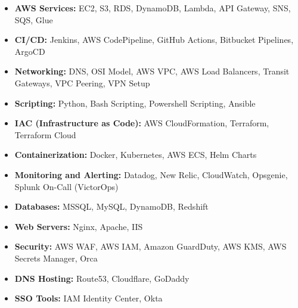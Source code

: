 \documentclass[10pt,a4paper,ragged2e,withhyper]{altacv}
\begin{document}


\begin{itemize}
    \item \textbf{AWS Services:} EC2, S3, RDS, DynamoDB, Lambda, API Gateway, SNS, SQS, Glue
    \item \textbf{CI/CD:} Jenkins, AWS CodePipeline, GitHub Actions, Bitbucket Pipelines, ArgoCD
    \item \textbf{Networking:} DNS, OSI Model, AWS VPC, AWS Load Balancers, Transit Gateways, VPC Peering, VPN Setup
    \item \textbf{Scripting:} Python, Bash Scripting, Powershell Scripting, Ansible
    \item \textbf{IAC (Infrastructure as Code):} AWS CloudFormation, Terraform, Terraform Cloud
    \item \textbf{Containerization:} Docker, Kubernetes, AWS ECS, Helm Charts
    \item \textbf{Monitoring and Alerting:} Datadog, New Relic, CloudWatch, Opsgenie, Splunk On-Call (VictorOps)
    \item \textbf{Databases:} MSSQL, MySQL, DynamoDB, Redshift
    \item \textbf{Web Servers:} Nginx, Apache, IIS
    \item \textbf{Security:} AWS WAF, AWS IAM, Amazon GuardDuty, AWS KMS, AWS Secrets Manager, Orca
    \item \textbf{DNS Hosting:} Route53, Cloudflare, GoDaddy
    \item \textbf{SSO Tools:} IAM Identity Center, Okta
\end{itemize}

\medskip



\medskip
\end{document}
